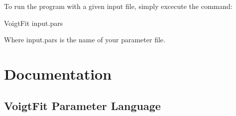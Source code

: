 \documentclass[letterpaper,10pt,english]{sphinxmanual}
\begin{document}
To run the program with a given input file, simply excecute the command:

%
\begin{sphinxVerbatim}[commandchars=\\\{\}]
\PYGZpc{}\PYG{o}{]} VoigtFit  input.pars
\end{sphinxVerbatim}

Where input.pars is the name of your parameter file.


\chapter{Documentation}
\label{\detokenize{index:documentation}}

\section{VoigtFit Parameter Language}
\label{\detokenize{documentation::doc}}\label{\detokenize{documentation:voigtfit-parameter-language}}
\end{document}
